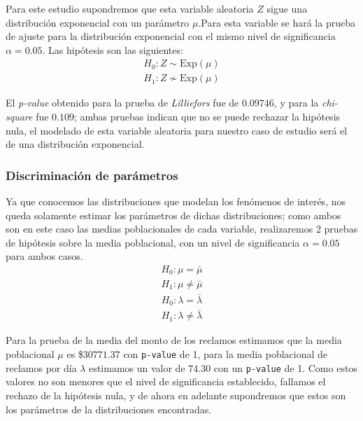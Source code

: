 \documentclass[journal]{IEEEtran}
\begin{document}
                Para este estudio supondremos que esta variable aleatoria $Z$ sigue una distribución exponencial con un parámetro $\mu$.Para esta variable se hará la prueba de ajuste para la distribución exponencial con el mismo nivel de significancia $\alpha = 0.05$. Las hipótesis son las siguientes:
                \begin{gather*}
                    H_0: Z \sim\text{Exp}(\mu) \\
                    H_1 : Z \not \sim \text{Exp}(\mu)
                \end{gather*}
                
                El \textit{p-value} obtenido para la prueba de \emph{Lilliefors} fue de $0.09746$, y para la \textit{chi-square} fue $0.109$; ambas pruebas indican que no se puede rechazar la hipótesis nula, el modelado de esta variable aleatoria para nuestro caso de estudio será el de una distribución exponencial.
            
            \subsubsection{Discriminación de parámetros}
                    
                Ya que conocemos las distribuciones que modelan los fenómenos de interés, nos queda solamente estimar los parámetros de dichas distribuciones; como ambos son en este caso las medias poblacionales de cada variable, realizaremos 2 pruebas de hipótesis sobre la media poblacional, con un nivel de significancia $\alpha = 0.05$ para ambos casos.
                \begin{gather*}
                    H_0: \mu = \bar{\mu} \\
                    H_1: \mu \neq \bar{\mu}
                \end{gather*}
                \begin{gather*}
                    H_0: \lambda = \bar{\lambda} \\
                    H_1: \lambda \neq \bar{\lambda}
                \end{gather*}

                Para la prueba de la media del monto de los reclamos estimamos que la media poblacional $\mu$ es \$$30771.37$ con \texttt{p-value} de 1, para la media poblacional de reclamos por día $\lambda$ estimamos un valor de $74.30$ con un \texttt{p-value} de 1. Como estos valores no son menores que el nivel de significancia establecido, fallamos el rechazo de la hipótesis nula, y de ahora en adelante supondremos que estos son los parámetros de la distribuciones encontradas.
                
\end{document}
